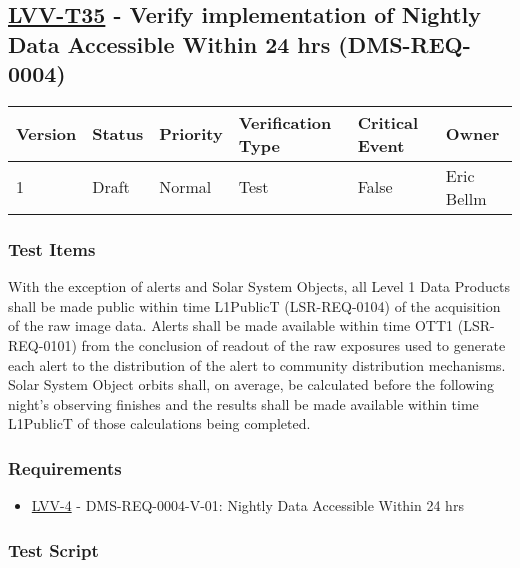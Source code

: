 \hypertarget{lvv-t35---verify-implementation-of-nightly-data-accessible-within-24-hrs-dms-req-0004}{%
\subsection{\texorpdfstring{\href{https://jira.lsstcorp.org/secure/Tests.jspa\#/testCase/LVV-T35}{LVV-T35}
- Verify implementation of Nightly Data Accessible Within 24 hrs
(DMS-REQ-0004)}{LVV-T35 - Verify implementation of Nightly Data Accessible Within 24 hrs (DMS-REQ-0004)}}\label{lvv-t35---verify-implementation-of-nightly-data-accessible-within-24-hrs-dms-req-0004}}

\begin{longtable}[]{@{}llllll@{}}
\toprule
Version & Status & Priority & Verification Type & Critical Event &
Owner\tabularnewline
\midrule
\endhead
1 & Draft & Normal & Test & False & Eric Bellm\tabularnewline
\bottomrule
\end{longtable}

\hypertarget{test-items-124}{%
\subsubsection{Test Items}\label{test-items-124}}

With the exception of alerts and Solar System Objects, all Level 1 Data
Products shall be made public within time L1PublicT (LSR-REQ-0104) of
the acquisition of the raw image data. Alerts shall be made available
within time OTT1 (LSR-REQ-0101) from the conclusion of readout of the
raw exposures used to generate each alert to the distribution of the
alert to community distribution mechanisms. Solar System Object orbits
shall, on average, be calculated before the following night's observing
finishes and the results shall be made available within time L1PublicT
of those calculations being completed.

\hypertarget{requirements-125}{%
\subsubsection{Requirements}\label{requirements-125}}

\begin{itemize}
\tightlist
\item
  \href{https://jira.lsstcorp.org/browse/LVV-4}{LVV-4} -
  DMS-REQ-0004-V-01: Nightly Data Accessible Within 24 hrs
\end{itemize}

\hypertarget{test-script-125}{%
\subsubsection{Test Script}\label{test-script-125}}

